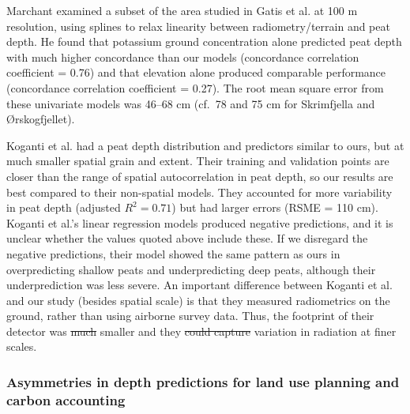 \documentclass[soil, manuscript]{copernicus}
\providecommand{\DIFadd}[1]{{\protect\color{blue}\uwave{#1}}} %
\providecommand{\DIFdel}[1]{{\protect\color{red}\sout{#1}}}                      %
\providecommand{\DIFaddbegin}{} %
\providecommand{\DIFaddend}{} %
\providecommand{\DIFdelbegin}{} %
\providecommand{\DIFdelend}{} %
\begin{document}
Marchant \citeyearpar{marchantUsingRemoteSensors2021} examined a subset of the area studied in Gatis et al. \citeyearpar{gatisMappingUplandPeat2019} at 100 m resolution, using splines to relax linearity between radiometry/terrain and peat depth.
He found that potassium ground concentration alone predicted peat depth with much higher concordance than our models (concordance correlation coefficient = 0.76) and that elevation alone produced comparable performance (concordance correlation coefficient = 0.27).
The root mean square error from these univariate models was 46--68 cm (cf.~78 and 75 cm for Skrimfjella and Ørskogfjellet).

Koganti et al. \citeyearpar{kogantiMappingPeatDepth2023} had a peat depth distribution and predictors similar to ours, but at much smaller spatial grain and extent.
Their training and validation points are closer than the range of spatial autocorrelation in peat depth, so our results are best compared to their non-spatial models.
They accounted for more variability in peat depth (adjusted \(R^2 = 0.71\)) but had larger errors (RSME = 110 cm).
Koganti et al.'s \citeyearpar{kogantiMappingPeatDepth2023} linear regression models produced negative predictions, and it is unclear whether the values quoted above include these.
If we disregard the negative predictions, their model showed the same pattern as ours in overpredicting shallow peats and underpredicting deep peats, although their underprediction was less severe.
An important difference between Koganti et al. \citeyearpar{kogantiMappingPeatDepth2023} and our study (besides spatial scale) is that they measured radiometrics on the ground, rather than using airborne survey data.
Thus, the footprint of their detector was \DIFdelbegin \DIFdel{much }\DIFdelend smaller and they \DIFdelbegin \DIFdel{could capture }\DIFdelend \DIFaddbegin \DIFadd{captured }\DIFaddend variation in radiation at finer scales.

\subsubsection{Asymmetries in depth predictions for land use planning and carbon accounting}
\end{document}
